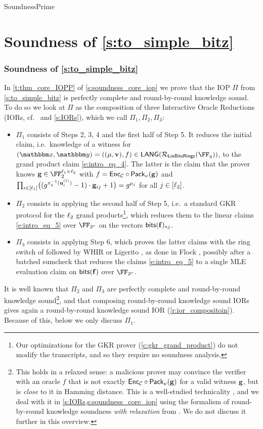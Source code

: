 \begin{lncsmove}{SoundnessPrime}
\iflncs\section{Soundness of \cref{s:to_simple_bitz}}\else\subsubsection{Soundness of \cref{s:to_simple_bitz}}\fi\label{s:to_soundness_prime}




In \cref{t:thm_core_IOPP} of \cref{s:soundness_core_iop} we prove that the IOP $\Pi$ from \cref{s:to_simple_bitz} is perfectly complete and round-by-round knowledge sound. To do so we look at $\Pi$ as the composition of three Interactive Oracle Reductions (IORs, cf.\ \cite{BCFW25} and \cref{s:IORs}), which we call $\Pi_1,\Pi_2,\Pi_3$:
\begin{itemize}[leftmargin=*,nosep]
\item $\Pi_1$ consists of Steps 2, 3, 4 and the first half of Step 5. It reduces the initial claim, i.e.\ knowledge of a witness for $(\inp,\oracle)=((\mu,\vv),f)\in \LANG(\LinBitsDual(\FF_q))$, to the grand product claim \eqref{e:intro_eq_4}. The latter is the claim that the prover knows $\bfg\in \FF_2^{\codedim_1\times \codedim_2}$ with $f=\mathsf{Enc}_{\mathcal{C}}\circ \mathsf{Pack}_\nu(\mathbf{g})$ and $\prod_{i\in [\ell_1]}\bigl((g^{\pi_q^{-1}(\mathbf{u}^{(1)}_i)}-1)\cdot \mathbf{g}_{ij}+1\bigr)=g^{\mu_j}$ for all $j\in [\ell_2]$. %
\item $\Pi_2$ consists in applying the second half of Step 5, i.e.\ a standard GKR protocol for the $\ell_2$ grand products\footnote{Our optimizations for the GKR prover (\cref{c:gkr_grand_product}) do not modify the transcripts, and so they require no soundness analysis.}, which reduces them to the linear claims \eqref{e:intro_eq_5} over $\comfield$ on the vectors $\mathsf{bits}(\mathbf{f})_{*j}$.
\item $\Pi_3$ consists in applying Step 6, which proves the latter claims with the ring switch of \cite{binius2} followed by WHIR or Ligerito \cite{whir,Ligerito}, as done in Flock \cite{flock}, possibly after a batched sumcheck that reduces the claims \eqref{e:intro_eq_5} to a single MLE evaluation claim on $\mathsf{bits}(\mathbf{f})$ over $\comfield$.
\end{itemize}
It is well known that $\Pi_2$ and $\Pi_3$ are perfectly complete and round-by-round knowledge sound\footnote{This holds in a relaxed sense: a malicious prover may convince the verifier with an oracle $f$ that is not exactly $\mathsf{Enc}_{\mathcal{C}}\circ \mathsf{Pack}_\nu(\mathbf{g})$ for a valid witness $\mathbf{g}$, but is \emph{close} to it in Hamming distance. This is a well-studied technicality \cite{stark,BCFW25,whir,zook}, and we deal with it in \cref{s:IORs,s:soundness_core_iop} using the formalism of round-by-round knowledge soundness \emph{with relaxation} from \cite{zook}. We do not discuss  it further in this overview.}, and that composing round-by-round knowledge sound IORs gives again a round-by-round knowledge sound IOR (\cref{r:ior_compositoin}). Because of this, below we only discuss $\Pi_1$. 



\end{lncsmove}

